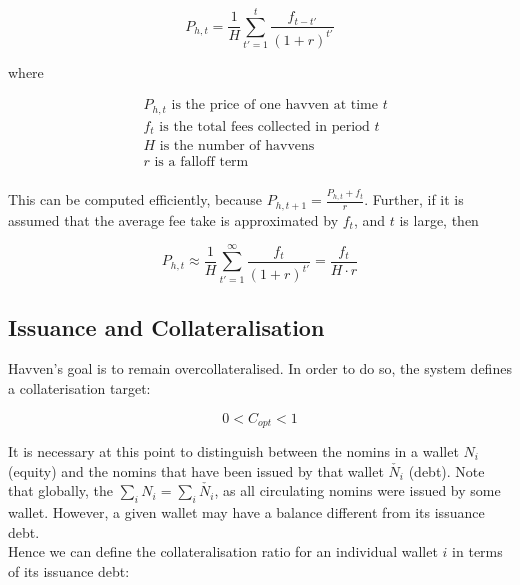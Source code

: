 \begin{equation}
    P_{h,t} = \frac{1}{H} \sum_{t'=1}^{t} \frac{f_{t - t'}}{(1 + r)^{t'}} \label{eq:price}
\end{equation}

where

\begin{align*} 
& P_{h,t} \text{ is the price of one havven at time } t  \\
& f_t \text{ is the total fees collected in period } t\\
& H \text{ is the number of havvens}  \\
& r \text{ is a falloff term}  \\
\end{align*}

\noindent This can be computed efficiently, because $P_{h,t+1} = \frac{P_{h,t} + f_t}{r}$. 
Further, if it is assumed that the average fee take is approximated by $f_t$, and $t$ is large, then

\begin{equation}
    P_{h,t} \approx \frac{1}{H} \sum_{t'=1}^{\infty} \frac{f_t}{(1 + r)^{t'}} = \frac{f_t}{H \cdot r}
\end{equation}

\newpage

\subsection{Issuance and Collateralisation} 


\noindent Havven's goal is to remain overcollateralised. In order to do so, the system defines a collaterisation target:

\begin{equation}
0 < C_{opt} < 1  \label{eq:target}
\end{equation}

\noindent It is necessary at this point to distinguish between the nomins in a wallet $N_i$ (equity) and the nomins that have been issued by that wallet $\check{N_i}$ (debt). Note that globally, the $\sum_{i}N_i = \sum_{i}\check{N_i}$, as all circulating nomins were issued by some wallet. However, a given wallet may have a balance different from its issuance debt.\\

\noindent Hence we can define the collateralisation ratio for an individual wallet $i$ in terms of its issuance debt:

